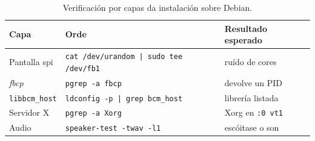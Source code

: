 \begin{table}[htbp]
  \centering
  \footnotesize
  \begin{tabular}{lp{5.2cm}p{3cm}}
    \hline
    \textbf{Capa} & \textbf{Orde} & \textbf{Resultado esperado} \\
    \hline
    Pantalla \acrshort{spi} & \texttt{cat /dev/urandom | sudo tee /dev/fb1} & ruído de cores \\
    \textit{fbcp}           & \texttt{pgrep -a fbcp}                        & devolve un PID \\
    \texttt{libbcm\_host}   & \texttt{ldconfig -p | grep bcm\_host}         & librería listada \\
    Servidor X              & \texttt{pgrep -a Xorg}                        & Xorg en \texttt{:0 vt1} \\
    Audio                   & \texttt{speaker-test -twav -l1}               & escóitase o son \\
    \hline
  \end{tabular}
  \caption{Verificación por capas da instalación sobre Debian.}
  \label{tab:verificacion-debian}
\end{table}
